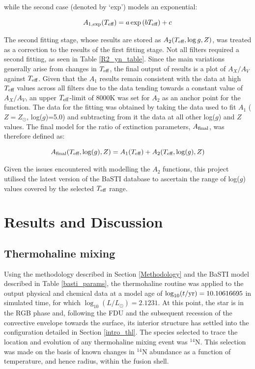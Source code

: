 \documentclass[12pt, a4paper]{report}
\begin{document}
while the second case (denoted by `exp') models an exponential:

\begin{equation}
A_{1,\textnormal{exp}} (T_{\textnormal{eff}}) = a \exp{(b T_{\textnormal{eff}})} + c
\label{Teff_exp}
\end{equation}

The second fitting stage, whose results are stored as $A_{2}(T_{\textnormal{eff}},\log{g},Z)$, was treated as a correction to the results of the first fitting stage. Not all filters required a second fitting, as seen in Table \ref{R2_yn_table}. Since the main variations generally arise from changes in $T_{\textnormal{eff}}$, the final output of results is a plot of $A_{X}/A_{V}$ against $T_{\textnormal{eff}}$. Given that the $A_{1}$ results remain consistent with the data at high $T_{\textnormal{eff}}$ values across all filters due to the data tending towards a constant value of $A_{X}/A_{V}$, an upper $T_{\textnormal{eff}}$-limit of 8000K was set for $A_{2}$ as an anchor point for the function. The data for the fitting was obtained by taking the data used to fit $A_{1}$ ($Z = Z_{\odot}$, log($g$)=5.0) and subtracting from it the data at all other log($g$) and $Z$ values. The final model for the ratio of extinction parameters, $A_{\textnormal{final}}$, was therefore defined as:

\begin{equation}
A_{\textnormal{final}}(T_{\textnormal{eff}},\log(g),Z) = A_{1}(T_{\textnormal{eff}}) + A_{2}(T_{\textnormal{eff}},\log(g),Z)
\label{Afinal}
\end{equation}

Given the issues encountered with modelling the $A_{2}$ functions, this project utilised the latest version of the BaSTI database \citep{2018ApJ...856..125H} to ascertain the range of log($g$) values covered by the selected $T_{\textnormal{eff}}$ range.

\chapter{Results and Discussion}
\section{Thermohaline mixing}
Using the methodology described in Section \ref{Methodology} and the BaSTI model described in Table \ref{basti_params}, the thermohaline routine was applied to the output physical and chemical data at a model age of $\log_{10}(t/\textnormal{yr}) = 10.10616695$ in simulated time, for which $\log_{10}(L/L_{\odot}) = 2.1231$. At this point, the star is in the RGB phase and, following the FDU and the subsequent recession of the convective envelope towards the surface, its interior structure has settled into the configuration detailed in Section \ref{intro_thl}. The species selected to trace the location and evolution of any thermohaline mixing event was $^{14}$N. This selection was made on the basis of known changes in $^{14}$N abundance as a function of temperature, and hence radius, within the fusion shell.
\end{document}
